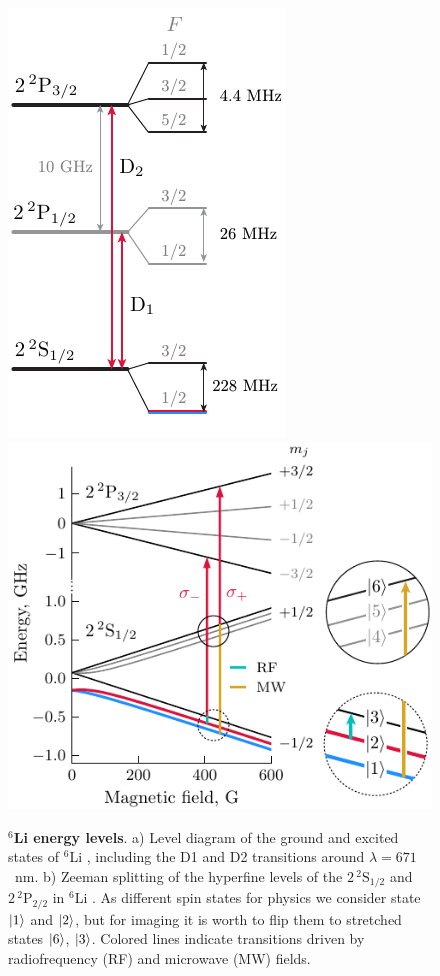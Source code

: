 




\begin{figure}
    \centering
    \includegraphics{fig-ai/li-levels-base.pdf}
    \hspace{1cm}
    \includegraphics{fig-ai/li6-zeeman-broken-ai.pdf}
    \caption{
        \textbf{${}^6$Li energy levels}. 
        a) Level diagram of the ground and excited states of ${}^6$Li \cite{gehm_preparation_2003}, including the D1 and D2 transitions around $\lambda = 671$~nm. 
        b) Zeeman splitting of the hyperfine levels of the $2\, {}^2\mathrm{S}_{1/2}$ and $2\, {}^2\mathrm{P}_{2/2}$ in ${}^6$Li \cite{serwane_deterministic_2011, sibalic_arc_2017}. As different spin states for physics we consider state $\left| 1 \right\rangle$ and $\left| 2 \right\rangle$, but for imaging it is worth to flip them to stretched states $\left| 6 \right\rangle$, $\left| 3 \right\rangle$. Colored lines indicate transitions driven by radiofrequency (RF) and microwave (MW) fields.
    }
    \label{fig:li6levels}
\end{figure}



